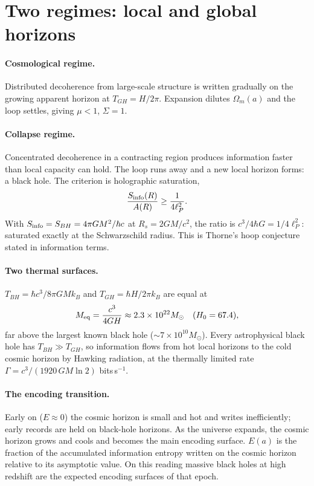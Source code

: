 \section{Two regimes: local and global horizons}
\paragraph{Cosmological regime.} Distributed decoherence from large-scale structure is written gradually on the growing apparent horizon at
$T_{GH}=H/2\pi$. Expansion dilutes $\Omega_m(a)$ and the loop settles, giving $\mu<1$, $\Sigma=1$.
\paragraph{Collapse regime.} Concentrated decoherence in a contracting region produces information faster than local capacity can hold. The loop runs
away and a new local horizon forms: a black hole. The criterion is holographic saturation,
\begin{equation}\frac{S_{\rm info}(R)}{A(R)}\ge\frac{1}{4\ell_P^2}.\end{equation}
With $S_{\rm info}=S_{BH}=4\pi GM^2/\hbar c$ at $R_s=2GM/c^2$, the ratio is $c^3/4\hbar G=1/4\ell_P^2$: saturated exactly at the Schwarzschild radius. This is
Thorne's hoop conjecture stated in information terms.
\paragraph{Two thermal surfaces.} $T_{BH}=\hbar c^3/8\pi GMk_B$ and $T_{GH}=\hbar H/2\pi k_B$ are equal at
\begin{equation}M_{\rm eq}=\frac{c^3}{4GH}\approx2.3\times10^{22}M_\odot\quad(H_0=67.4),\end{equation}
far above the largest known black hole ($\sim7\times10^{10}M_\odot$). Every astrophysical black hole has $T_{BH}\gg T_{GH}$, so information flows from hot local
horizons to the cold cosmic horizon by Hawking radiation, at the thermally limited rate $\Gamma=c^3/(1920\,GM\ln2)$ bits\,s$^{-1}$. \calc
\paragraph{The encoding transition.} Early on ($E\approx0$) the cosmic horizon is small and hot and writes inefficiently; early records are held on
black-hole horizons. As the universe expands, the cosmic horizon grows and cools and becomes the main encoding surface. $E(a)$ is the fraction of the
accumulated information entropy written on the cosmic horizon relative to its asymptotic value. On this reading massive black holes at high redshift are
the expected encoding surfaces of that epoch.

